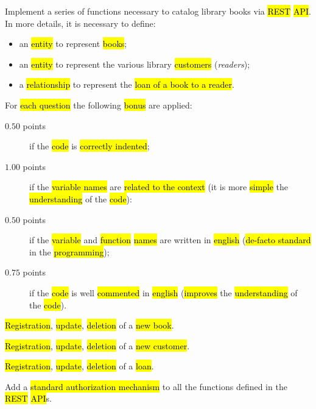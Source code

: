 \documentclass[a4paper,11pt,addpoints,answers]{exam}
\begin{document}
\addheader


Implement a series of functions necessary to catalog library books via \hl{REST} \hl{API}.
In more details, it is necessary to define:

\begin{itemize}
    \item an \hl{entity} to represent \hl{books};
    \item an \hl{entity} to represent the various library \hl{customers} (\emph{readers});
    \item a \hl{relationship} to represent the \hl{loan of a book to a reader}.
\end{itemize}

For \hl{each question} the following \hl{bonus} are applied:

\begin{description}
    \item[$0.50$ points] if the \hl{code} is \hl{correctly indented};
    \item[$1.00$ points] if the \hl{variable names} are \hl{related to the context} (it is more \hl{simple} the \hl{understanding} of the \hl{code}):
    \item[$0.50$ points] if the \hl{variable} and \hl{function} \hl{names} are written in \hl{english} (\hl{de-facto standard} in the \hl{programming});
    \item[$0.75$ points] if the \hl{code} is well \hl{commented} in \hl{english} (\hl{improves} the \hl{understanding} of the \hl{code}).
\end{description}

\begin{questions}
    \question[6] \hl{Registration}, \hl{update}, \hl{deletion} of a \hl{new book}.

    \questionspace

    \question[6] \hl{Registration}, \hl{update}, \hl{deletion} of a \hl{new customer}.

    \questionspace

    \question[13] \hl{Registration}, \hl{update}, \hl{deletion} of a \hl{loan}.

    \questionspace

    \question[5] Add a \hl{standard authorization mechanism} to all the functions defined in the \hl{REST} \hl{API}s.
\end{questions}

\end{document}
